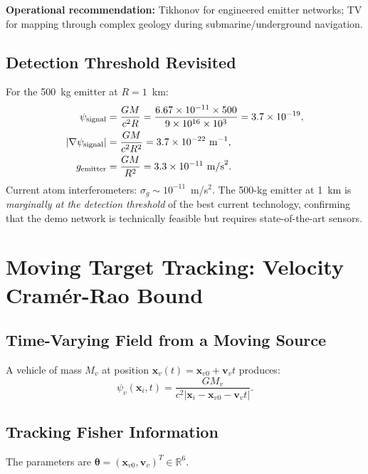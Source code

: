 \documentclass[aps,prd,twocolumn,superscriptaddress,nofootinbib]{revtex4-2}
\newcommand{\xvec}{\mathbf{x}}
\begin{document}
\textbf{Operational recommendation:} Tikhonov for engineered emitter
networks; TV for mapping through complex geology during submarine/underground
navigation.

\subsection{Detection Threshold Revisited}

For the 500~kg emitter at $R=1$~km:
\begin{align}
\psi_{\rm signal} &= \frac{GM}{c^2 R}
= \frac{6.67\times10^{-11}\times500}{9\times10^{16}\times10^3}
= 3.7\times10^{-19}, \\
|\nabla\psi_{\rm signal}| &= \frac{GM}{c^2 R^2}
= 3.7\times10^{-22}~\mathrm{m}^{-1}, \\
g_{\rm emitter} &= \frac{GM}{R^2} = 3.3\times10^{-11}~\mathrm{m/s}^2.
\end{align}
Current atom interferometers: $\sigma_g \sim 10^{-11}$~m/s$^2$.
The 500-kg emitter at 1~km is \emph{marginally at the detection threshold}
of the best current technology, confirming that the demo network is
technically feasible but requires state-of-the-art sensors.

\section{Moving Target Tracking: Velocity Cram\'er-Rao Bound}
\label{sec:tracking}

\subsection{Time-Varying Field from a Moving Source}

A vehicle of mass $M_v$ at position $\mathbf{x}_v(t) = \mathbf{x}_{v0} + \mathbf{v}_v t$
produces:
\begin{equation}
\psi_v(\xvec_i,t) = \frac{GM_v}{c^2|\xvec_i - \mathbf{x}_{v0} - \mathbf{v}_v t|}.
\label{eq:psi-moving}
\end{equation}

\subsection{Tracking Fisher Information}

The parameters are $\boldsymbol{\theta} = (\mathbf{x}_{v0},\mathbf{v}_v)^T \in \mathbb{R}^6$.
\end{document}
